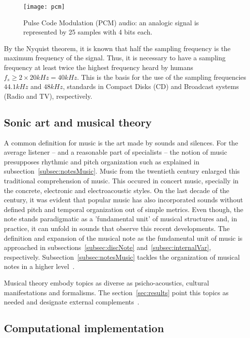 \documentclass[
 aip,
 jmp,
 amsmath,amssymb,
 reprint,
]{revtex4-1}
\begin{document}
\begin{figure*}
    \centering
        \texttt{[image: pcm]}
        \caption{Pulse Code Modulation (PCM) audio: an analogic signal is represented by 25 samples with 4 bits each.}
        \label{fig:PCM}
\end{figure*}




By the Nyquist theorem, it is known that half the sampling frequency is the maximum frequency of the signal. Thus, it is necessary to have a sampling frequency at least twice the highest frequency heard by humans $f_s \geq 2\times 20kHz = 40kHz$. This is the basis for the use of the sampling frequencies $44.1kHz$ and $48kHz$, standards in Compact Disks (CD) and Broadcast systems (Radio and TV), respectively.

\subsection{Sonic art and musical theory}

A common definition for music is the art made by sounds and silences. For the average listener -- and a reasonable part of specialists -- the notion of music presupposes rhythmic and pitch organization such as explained in subsection~\ref{subsec:notesMusic}. Music from the twentieth century enlarged this traditional comprehension of music. This occured in concert music, specially in the concrete, electronic and electroacoustic styles. On the last decade of the century, it was evident that popular music has also incorporated sounds without defined pitch and temporal organization out of simple metrics. Even though, the note stands paradigmatic as a 'fundamental unit' of musical structures and, in practice, it can unfold in sounds that observe this recent developments. The definition and expansion of the musical note as the fundamental unit of music is approached in subsections~\ref{subsec:discNote} and~\ref{subsec:internalVar}, respectively. Subsection~\ref{subsec:notesMusic} tackles the organization of musical notes in a higher level~\cite{Wisnick,Webern,Lerdhal,Cook,Lacerda}.

Musical theory embody topics as diverse as psicho-acoustics, cultural manifestations and formalisms. The section~\ref{sec:results} point this topics as needed and designate external complements~\cite{Zamacois,Schoenberg,microsound}.

\subsection{Computational implementation}
\end{document}
